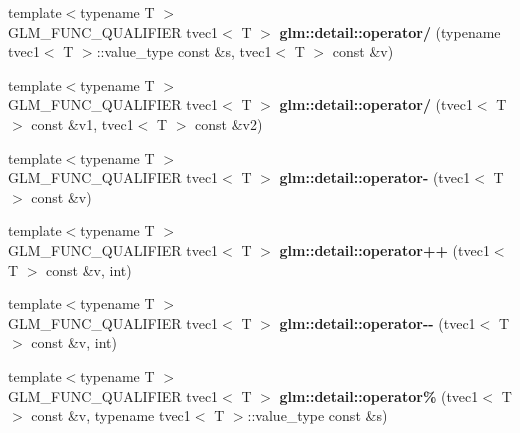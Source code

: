 \begin{DoxyCompactItemize}
\item 
\hypertarget{namespaceglm_1_1detail_a21509cda8560c565139f8b835d9f66e0}{{\footnotesize template$<$typename T $>$ }\\G\-L\-M\-\_\-\-F\-U\-N\-C\-\_\-\-Q\-U\-A\-L\-I\-F\-I\-E\-R tvec1$<$ T $>$ {\bfseries glm\-::detail\-::operator/} (typename tvec1$<$ T $>$\-::value\-\_\-type const \&s, tvec1$<$ T $>$ const \&v)}\label{namespaceglm_1_1detail_a21509cda8560c565139f8b835d9f66e0}

\item 
\hypertarget{namespaceglm_1_1detail_aee9243f682c096dbae3ce672b811750f}{{\footnotesize template$<$typename T $>$ }\\G\-L\-M\-\_\-\-F\-U\-N\-C\-\_\-\-Q\-U\-A\-L\-I\-F\-I\-E\-R tvec1$<$ T $>$ {\bfseries glm\-::detail\-::operator/} (tvec1$<$ T $>$ const \&v1, tvec1$<$ T $>$ const \&v2)}\label{namespaceglm_1_1detail_aee9243f682c096dbae3ce672b811750f}

\item 
\hypertarget{namespaceglm_1_1detail_ac31957ab3e113b6049b68234fca9f67f}{{\footnotesize template$<$typename T $>$ }\\G\-L\-M\-\_\-\-F\-U\-N\-C\-\_\-\-Q\-U\-A\-L\-I\-F\-I\-E\-R tvec1$<$ T $>$ {\bfseries glm\-::detail\-::operator-\/} (tvec1$<$ T $>$ const \&v)}\label{namespaceglm_1_1detail_ac31957ab3e113b6049b68234fca9f67f}

\item 
\hypertarget{namespaceglm_1_1detail_a574ce6893275a07cba6d8bb7c65c09c7}{{\footnotesize template$<$typename T $>$ }\\G\-L\-M\-\_\-\-F\-U\-N\-C\-\_\-\-Q\-U\-A\-L\-I\-F\-I\-E\-R tvec1$<$ T $>$ {\bfseries glm\-::detail\-::operator++} (tvec1$<$ T $>$ const \&v, int)}\label{namespaceglm_1_1detail_a574ce6893275a07cba6d8bb7c65c09c7}

\item 
\hypertarget{namespaceglm_1_1detail_a56c5b1a5cb56bbecd799d234d43eec7a}{{\footnotesize template$<$typename T $>$ }\\G\-L\-M\-\_\-\-F\-U\-N\-C\-\_\-\-Q\-U\-A\-L\-I\-F\-I\-E\-R tvec1$<$ T $>$ {\bfseries glm\-::detail\-::operator-\/-\/} (tvec1$<$ T $>$ const \&v, int)}\label{namespaceglm_1_1detail_a56c5b1a5cb56bbecd799d234d43eec7a}

\item 
\hypertarget{namespaceglm_1_1detail_afe3345197cfebf3b3c55e2d615776ca6}{{\footnotesize template$<$typename T $>$ }\\G\-L\-M\-\_\-\-F\-U\-N\-C\-\_\-\-Q\-U\-A\-L\-I\-F\-I\-E\-R tvec1$<$ T $>$ {\bfseries glm\-::detail\-::operator\%} (tvec1$<$ T $>$ const \&v, typename tvec1$<$ T $>$\-::value\-\_\-type const \&s)}\label{namespaceglm_1_1detail_afe3345197cfebf3b3c55e2d615776ca6}


\end{DoxyCompactItemize}
